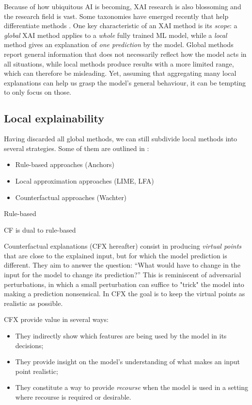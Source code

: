 \documentclass[../main.tex]{subfiles}
\begin{document}
Because of how ubiquitous AI is becoming, XAI research is also blossoming and the research field is vast.
Some taxonomies have emerged recently that help differentiate methods \cite{zhangSurvey2021, bellePrinciples2021}.
One key characteristic of an XAI method is its \emph{scope}: a \emph{global} XAI method applies to a \emph{whole} fully trained ML model, while a \emph{local} method gives an explanation of \emph{one prediction} by the model.
Global methods report general information that does not necessarily reflect
how the model acts in all situations, while local methods produce results with
a more limited range, which can therefore be misleading.
Yet, assuming that aggregating many local explanations can help us grasp
the model's general behaviour, it can be tempting to only focus on those.

\subsection{Local explainability}
Having discarded all global methods, we can still subdivide local methods into several strategies. Some of them are outlined in \cite{bellePrinciples2021}:

\begin{itemize}
    \item Rule-based approaches (Anchors)
    \item Local approximation approaches (LIME, LFA)
    \item Counterfactual approaches (Wachter)
\end{itemize}

Rule-based 

CF is dual to rule-based

Counterfactual explanations (CFX hereafter) consist in producing \emph{virtual points} that are close to the explained input, but for which the model prediction is different.
They aim to answer the question: ``What would have to change in the input for the model to change its prediction?''
This is reminiscent of adversarial perturbations, in which a small perturbation can suffice to "trick" the model into making a prediction nonsensical.
In CFX the goal is to keep the virtual points as realistic as possible.

CFX provide value in several ways:
\begin{itemize}
    \item They indirectly show which features are being used by the model in its decisions;
    \item They provide insight on the model's understanding of what makes an input point realistic;
    \item They constitute a way to provide \emph{recourse} when the model is used in a setting where recourse is required or desirable.
\end{itemize}
\end{document}
